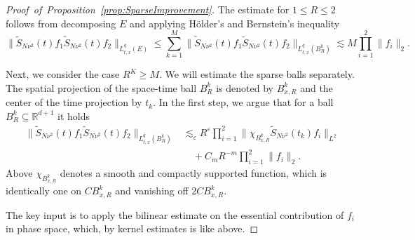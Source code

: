 \documentclass{amsart}
\numberwithin{equation}{section}
\theoremstyle{definition}
\newcommand{\R}{\mathbb{R}}
\begin{document}
\begin{proof}[Proof~of~Proposition~\ref{prop:SparseImprovement}]
The estimate for $1 \leq R \leq 2$ follows from decomposing $E$ and applying H\"older's and Bernstein's inequality
\begin{equation*}
\| \tilde{S}_{N \nu^2}(t) f_1 \tilde{S}_{N \nu^2}(t) f_2 \|_{L^{\bar{q}}_{t,x}(E)} \leq \sum_{k=1}^M \| \tilde{S}_{N \nu^2}(t) f_1 \tilde{S}_{N \nu^2}(t) f_2 \|_{L^{\bar{q}}_{t,x}(B_R^k)} \lesssim M \prod_{i=1}^2 \| f_i \|_2.
\end{equation*}

Next, we consider the case $R^K \geq M$.
We will estimate the sparse balls separately. The spatial projection of the space-time ball $B_R^k$ is denoted by $B_{x,R}^k$ and the center of the time projection by $t_k$.
In the first step, we argue that for a ball $B_R^k \subseteq \R^{d+1}$ it holds
\begin{equation}
\label{eq:SparseEstimateLocalized}
\begin{split}
    \| \tilde{S}_{N \nu^2}(t) f_1 \tilde{S}_{N \nu^2}(t) f_2 \|_{L^{\bar{q}}_{t,x}(B^k_R)} &\lesssim_{\varepsilon} R^{\varepsilon}  \prod_{i=1}^2 \| \chi_{B_{x,R}^k} \tilde{S}_{N \nu^2}(t_k) f_i \|_{L^2} \\
    &\quad + C_m R^{-m} \prod_{i=1}^2 \| f_i \|_2.
\end{split}
\end{equation}
Above $\chi_{B_{x,R}^k}$ denotes a smooth and compactly supported function, which is identically one on $C B_{x,R}^k$ and vanishing off $2 C B_{x,R}^k$.

The key input is to apply the bilinear estimate \cite{SchippaTataru2025} 
on the essential contribution of $f_i$ in phase space, which, by kernel estimates is like above.


\end{proof}
\end{document}
